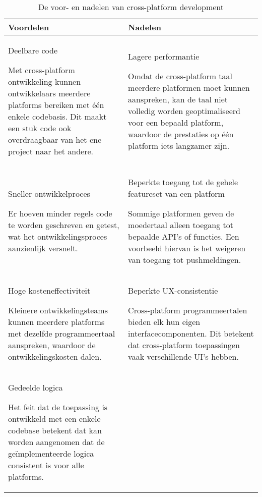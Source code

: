 \begin{table}[H]
    \centering
    \begin{tabular}{|p{3.0in}|p{3.0in}|}
        \hline
        Voordelen & Nadelen 
        \\
        \hline
        \hline
        Deelbare code
        
        Met cross-platform ontwikkeling kunnen ontwikkelaars meerdere platforms bereiken met één enkele codebasis. Dit maakt een stuk code ook overdraagbaar van het ene project naar het andere.
            &
        Lagere performantie
        
        Omdat de cross-platform taal meerdere platformen moet kunnen aanspreken, kan de taal niet volledig worden geoptimaliseerd voor een bepaald platform, waardoor de prestaties op één platform iets langzamer zijn.
        \\\hline
        Sneller ontwikkelproces
        
        Er hoeven minder regels code te worden geschreven en getest, wat het ontwikkelingsproces aanzienlijk versnelt.
            &
        Beperkte toegang tot de gehele featureset van een platform
        
        Sommige platformen geven de moedertaal alleen toegang tot bepaalde API's of functies.
        Een voorbeeld hiervan is het weigeren van toegang tot pushmeldingen.
        \\\hline
        Hoge kosteneffectiviteit
        
        Kleinere ontwikkelingsteams kunnen meerdere platforms met dezelfde programmeertaal aanspreken, waardoor de ontwikkelingskosten dalen.
        &
        Beperkte UX-consistentie
        
        Cross-platform programmeertalen bieden elk hun eigen interfacecomponenten. Dit betekent dat cross-platform toepassingen vaak verschillende UI's hebben.
        \\\hline
        Gedeelde logica
        
        Het feit dat de toepassing is ontwikkeld met een enkele codebase betekent dat kan worden aangenomen dat de geïmplementeerde logica consistent is voor alle platforms.
        
        &
        
        \\\hline
    \end{tabular}
    \caption[De voor- en nadelen van cross-platform development]{De voor- en nadelen van cross-platform development \autocite{KotlinFoundation2023}}
    \label{tab:crossPlatformDevelopmentTable}
\end{table}

